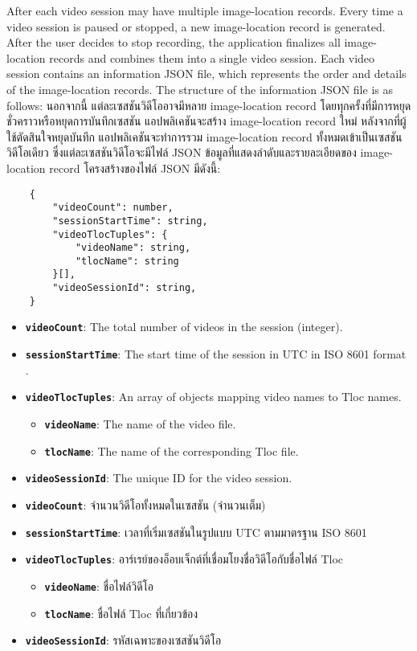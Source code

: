 \ifenglish
After each video session may have multiple image-location records. Every time a video session is paused or stopped, a new image-location record is generated. After the user decides to stop recording, the application finalizes all image-location records and combines them into a single video session. Each video session contains an information JSON file, which represents the order and details of the image-location records. The structure of the information JSON file is as follows:
\else
นอกจากนี้ แต่ละเซสชันวิดีโออาจมีหลาย image-location record โดยทุกครั้งที่มีการหยุดชั่วคราวหรือหยุดการบันทึกเซสชัน แอปพลิเคชันจะสร้าง image-location record ใหม่ หลังจากที่ผู้ใช้ตัดสินใจหยุดบันทึก แอปพลิเคชันจะทำการรวม image-location record ทั้งหมดเข้าเป็นเซสชันวิดีโอเดียว ซึ่งแต่ละเซสชันวิดีโอจะมีไฟล์ JSON ข้อมูลที่แสดงลำดับและรายละเอียดของ image-location record โครงสร้างของไฟล์ JSON มีดังนี้:
\fi

\begin{lstlisting}
    {
        "videoCount": number,
        "sessionStartTime": string,
        "videoTlocTuples": {
            "videoName": string, 
            "tlocName": string 
        }[],
        "videoSessionId": string,
    }
\end{lstlisting}

\ifenglish
\begin{itemize}
    \item \textbf{\texttt{videoCount}}: The total number of videos in the session (integer).
    \item \textbf{\texttt{sessionStartTime}}: The start time of the session in UTC in ISO 8601 format \cite{iso8601}.
    \item \textbf{\texttt{videoTlocTuples}}: An array of objects mapping video names to Tloc names.
    \begin{itemize}
        \item \textbf{\texttt{videoName}}: The name of the video file.
        \item \textbf{\texttt{tlocName}}: The name of the corresponding Tloc file.
    \end{itemize}
    \item \textbf{\texttt{videoSessionId}}: The unique ID for the video session.
\end{itemize}
\else
\begin{itemize}
    \item \textbf{\texttt{videoCount}}: จำนวนวิดีโอทั้งหมดในเซสชัน (จำนวนเต็ม)
    \item \textbf{\texttt{sessionStartTime}}: เวลาที่เริ่มเซสชันในรูปแบบ UTC ตามมาตรฐาน ISO 8601 \cite{iso8601}
    \item \textbf{\texttt{videoTlocTuples}}: อาร์เรย์ของอ็อบเจ็กต์ที่เชื่อมโยงชื่อวิดีโอกับชื่อไฟล์ Tloc
    \begin{itemize}
        \item \textbf{\texttt{videoName}}: ชื่อไฟล์วิดีโอ
        \item \textbf{\texttt{tlocName}}: ชื่อไฟล์ Tloc ที่เกี่ยวข้อง
    \end{itemize}
    \item \textbf{\texttt{videoSessionId}}: รหัสเฉพาะของเซสชันวิดีโอ
\end{itemize}
\fi


